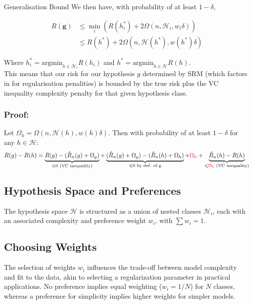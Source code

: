     \begin{definitionbox}{Generalisation Bound}
        We then have, with probability of at least $1-\delta$,

        \begin{align*}
R(\mathbf{g})& \leqslant\min_{i}\left(R(h_{i}^{*})+2\Omega(n,{\mathcal H}_{i},w_{i}\delta)\right)  \\
&\leqslant R(h^*)+2\Omega(n,\mathcal{H}(h^*),w(h^*)\delta)
\end{align*}

Where $h^*_i = \text{argmin}_{h\in\mathcal{H}_i}R(h_i)$ and $h^* = \text{argmin}_{h\in\mathcal{H}}R(h)$.\\

This means that our risk for our hypothesis $g$ determined by SRM (which factors in for regularisation penalities) is bounded by the true risk plus the VC inequality complexity penalty for that given hypothesis class.

\subsubsection*{Proof:}
Let $\Omega_h = \Omega(n, \mathcal{H}(h), w(h)\delta)$. Then with probability of at least $1-\delta$ for any $h \in \mathcal{H}:$
\[R(g)-R(h)=\underbrace{R(g)-(\hat{R}_n(g)+\Omega_g)}_{\leqslant0\text{ (VC inequality)}}+\underbrace{(\hat{R}_n(g)+\Omega_g)-(\hat{R}_n(h)+\Omega_h)}_{\leqslant0\text{ by def. of g}}+{\color{red}\Omega_h}+\underbrace{\hat{R}_n(h)-R(h)}_{\leqslant{\color{red}\Omega_h}\text{ (VC inequality)}}\]
    \end{definitionbox}

\subsection*{Hypothesis Space and Preferences}
The hypothesis space \( \mathcal{H} \) is structured as a union of nested classes \( \mathcal{H}_i \), each with an associated complexity and preference weight \( w_i \), with \( \sum w_i = 1 \).

\subsection*{Choosing Weights}
The selection of weights \( w_i \) influences the trade-off between model complexity and fit to the data, akin to selecting a regularization parameter in practical applications. No preference implies equal weighting ($w_i = 1/N$) for $N$ classes, whereas a preference for simplicity implies higher weights for simpler models.


